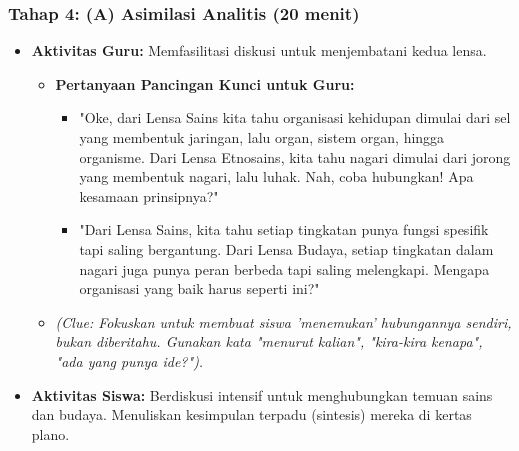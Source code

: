 \documentclass[a4paper,12pt]{article}
\begin{document}
\subsubsection{Tahap 4: (A) Asimilasi Analitis (20 menit)}
\begin{itemize}
\item \textbf{Aktivitas Guru:} Memfasilitasi diskusi untuk menjembatani kedua lensa.
    \begin{itemize}
    \item \textbf{Pertanyaan Pancingan Kunci untuk Guru:}
        \begin{itemize}
        \item "Oke, dari Lensa Sains kita tahu organisasi kehidupan dimulai dari sel yang membentuk jaringan, lalu organ, sistem organ, hingga organisme. Dari Lensa Etnosains, kita tahu nagari dimulai dari jorong yang membentuk nagari, lalu luhak. Nah, coba hubungkan! Apa kesamaan prinsipnya?"
        \item "Dari Lensa Sains, kita tahu setiap tingkatan punya fungsi spesifik tapi saling bergantung. Dari Lensa Budaya, setiap tingkatan dalam nagari juga punya peran berbeda tapi saling melengkapi. Mengapa organisasi yang baik harus seperti ini?"
        \end{itemize}
    \item \textit{(Clue: Fokuskan untuk membuat siswa 'menemukan' hubungannya sendiri, bukan diberitahu. Gunakan kata "menurut kalian", "kira-kira kenapa", "ada yang punya ide?").}
    \end{itemize}
\item \textbf{Aktivitas Siswa:} Berdiskusi intensif untuk menghubungkan temuan sains dan budaya. Menuliskan kesimpulan terpadu (sintesis) mereka di kertas plano.
\end{itemize}
\end{document}
